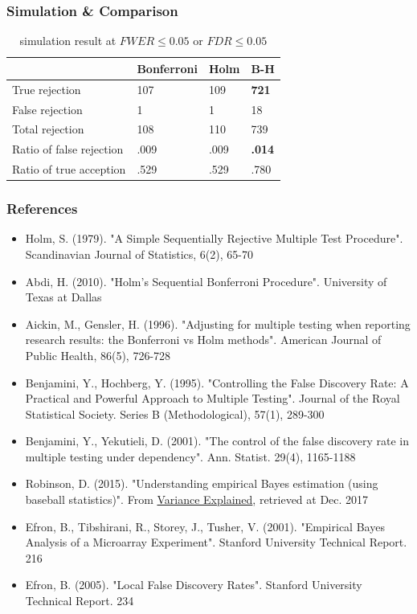 \documentclass{beamer}
\begin{document}
\frame
{
    \frametitle{\LARGE Simulation \& Comparison}
    \normalsize
    \begin{table}
      \small
      \setlength{\tabcolsep}{3pt}
    \begin{tabularx}{\hsize}{@{}l LLL@{}}
        \toprule
     & Bonferroni  & Holm & B-H \\
        \midrule
    True rejection
        & 107
            & 109
                & \textbf{721}\\
    False rejection 
        &  1
            & 1
                & 18 \\
    Total rejection
        & 108
            & 110
                &  739   \\
    \midrule
    Ratio of false rejection 
            & .009
                & .009
                    & \textbf{.014}    \\
    Ratio of true acception 
            & .529
                & .529
                    & .780    \\
        \bottomrule
      \end{tabularx}
      \caption{simulation result at $FWER \leq 0.05$ or $FDR \leq 0.05$}
    \end{table}
}


\frame
{
    \frametitle{\LARGE References}
    \scriptsize
    \begin{itemize}
\item Holm, S. (1979). "A Simple Sequentially Rejective Multiple Test Procedure". Scandinavian Journal of Statistics, 6(2), 65-70\\
\item Abdi, H. (2010). "Holm's Sequential Bonferroni Procedure". University of Texas at Dallas\\
\item Aickin, M., Gensler, H. (1996). "Adjusting for multiple testing when reporting research results: the Bonferroni vs Holm methods". American Journal of Public Health, 86(5), 726-728\\
\item Benjamini, Y., Hochberg, Y. (1995). "Controlling the False Discovery Rate: A Practical and Powerful Approach to Multiple Testing". Journal of the Royal Statistical Society. Series B (Methodological), 57(1), 289-300\\
\item Benjamini, Y., Yekutieli, D. (2001). "The control of the false discovery rate in multiple testing under dependency". Ann. Statist. 29(4), 1165-1188\\
\item Robinson, D. (2015). "Understanding empirical Bayes estimation (using baseball statistics)". From \href{http://varianceexplained.org/r/empirical\_bayes\_baseball/}{Variance Explained}, retrieved at Dec. 2017 \\
\item Efron, B., Tibshirani, R., Storey, J., Tusher, V. (2001). "Empirical Bayes Analysis of a Microarray Experiment". Stanford University Technical Report. 216\\
\item Efron, B. (2005). "Local False Discovery Rates". Stanford University Technical Report. 234\\
    \end{itemize}
}
\end{document}
